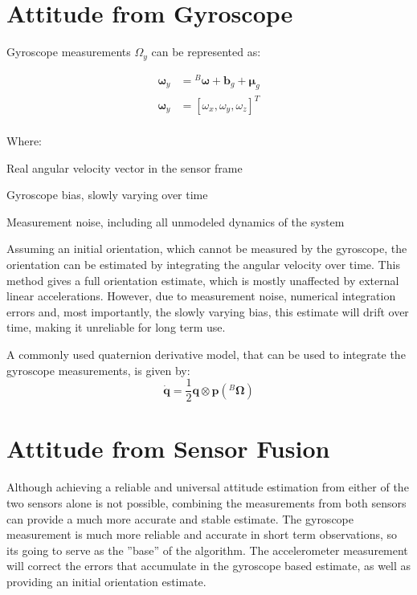 \section{Attitude from Gyroscope}

Gyroscope measurements $\Omega_y$ can be represented as:

\begin{equation}
	\begin{aligned}
		\boldsymbol{\omega}_y & = {}^B\boldsymbol{\omega} + \boldsymbol{b}_g + \boldsymbol{\mu}_g \\
		\boldsymbol{\omega}_y & = \left[\omega_{x}, \omega_{y}, \omega_{z}\right]^T           \\
	\end{aligned}
	\label{eq:y_gyro}
\end{equation}

Where:
\begin{eqwhere}[3cm]
	\item[${}^B\boldsymbol{\omega}$] Real angular velocity vector in the sensor frame
	\item[${}\boldsymbol{b}_g$] Gyroscope bias, slowly varying over time
	\item[${}\boldsymbol{\mu}_g$] Measurement noise, including all unmodeled dynamics of the system
\end{eqwhere}

Assuming an initial orientation, which cannot be measured by the gyroscope, the orientation can be estimated by integrating the angular velocity over time. This method gives a full orientation estimate, which is mostly unaffected by external linear accelerations. However, due to measurement noise, numerical integration errors and, most importantly, the slowly varying bias, this estimate will drift over time, making it unreliable for long term use.

A commonly used quaternion derivative model, that can be used to integrate the gyroscope measurements, is given by:
\begin{equation}
	\dot{\boldsymbol{q}} = \frac{1}{2}\boldsymbol {q} \otimes \boldsymbol{p}(^{B}\boldsymbol{\Omega})
	\label{eq:gyro_q_dot}
\end{equation}

\section{Attitude from Sensor Fusion}

Although achieving a reliable and universal attitude estimation from either of the two sensors alone is not possible, combining the measurements from both sensors can provide a much more accurate and stable estimate.
The gyroscope measurement is much more reliable and accurate in short term observations, so its going to serve as the ''base'' of the algorithm. The accelerometer measurement will correct the errors that accumulate in the gyroscope based estimate, as well as providing an initial orientation estimate.